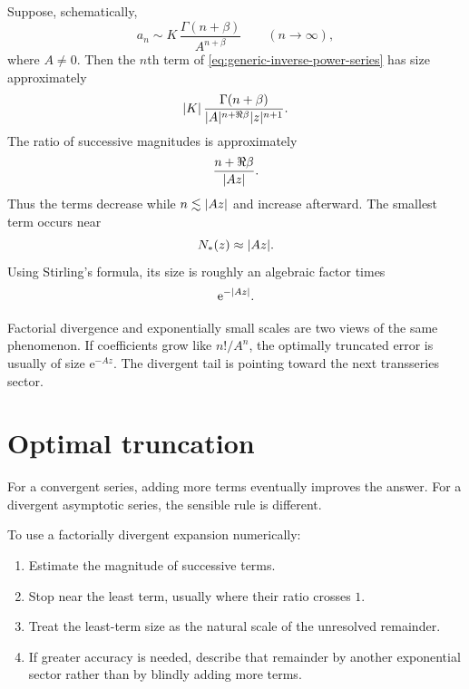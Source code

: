 \documentclass[11pt,oneside]{book}
\theoremstyle{definition}
\theoremstyle{remark}
\newcommand{\e}{\mathrm{e}}
\DeclarePairedDelimiter{\abs}{\lvert}{\rvert}
\begin{document}
Suppose, schematically,
\begin{equation}
  a_n\sim K\,\frac{\Gamma(n+\beta)}{A^{n+\beta}}
  \qquad(n\to\infty),
  \label{eq:factorial-over-power-growth}
\end{equation}
where $A\ne0$. Then the $n$th term of \eqref{eq:generic-inverse-power-series}
has size approximately
\[
  \abs{K}\,
  \frac{\Gamma(n+\beta)}{\abs{A}^{n+\Re\beta}\abs z^{n+1}}.
\]
The ratio of successive magnitudes is approximately
\[
  \frac{n+\Re\beta}{\abs{Az}}.
\]
Thus the terms decrease while $n\lesssim\abs{Az}$ and increase afterward. The
smallest term occurs near
\begin{equation}
  N_*(z)\approx\abs{Az}.
  \label{eq:least-term-index}
\end{equation}
Using Stirling's formula, its size is roughly an algebraic factor times
\begin{equation}
  \e^{-\abs{Az}}.
  \label{eq:least-term-exponential}
\end{equation}

\begin{bigidea}
Factorial divergence and exponentially small scales are two views of the same
phenomenon. If coefficients grow like $n!/A^n$, the optimally truncated error is
usually of size $\e^{-Az}$. The divergent tail is pointing toward the next
transseries sector.
\end{bigidea}

\section{Optimal truncation}

For a convergent series, adding more terms eventually improves the answer. For a
divergent asymptotic series, the sensible rule is different.

\begin{recipebox}
To use a factorially divergent expansion numerically:
\begin{enumerate}
\item Estimate the magnitude of successive terms.
\item Stop near the least term, usually where their ratio crosses $1$.
\item Treat the least-term size as the natural scale of the unresolved
remainder.
\item If greater accuracy is needed, describe that remainder by another
exponential sector rather than by blindly adding more terms.
\end{enumerate}
\end{recipebox}
\end{document}
